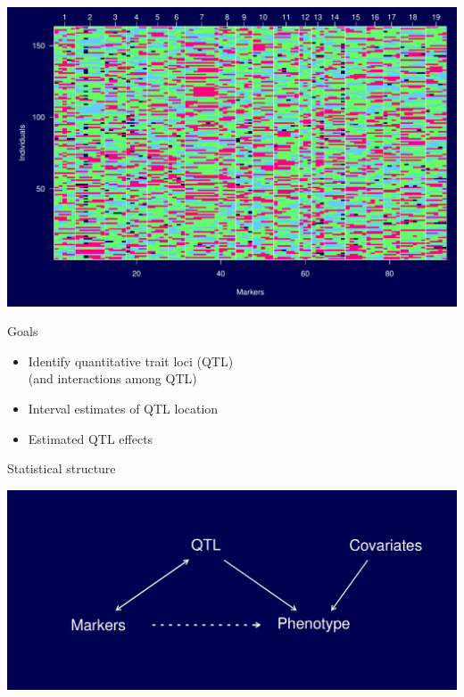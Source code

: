\documentclass[12pt]{article}
\newcommand{\headsize}{\fontsize{35}{35} \selectfont}
\newcommand{\smallsize}{\fontsize{25}{30} \selectfont}
\newcommand{\smallersize}{\fontsize{20}{25} \selectfont}
\begin{document}
\centerline{\includegraphics{FigsA/genodata.pdf}}


\newpage

\headsize \color{myyellow}
\hfill \begin{minipage}{5.75in}
\centering
Goals
\end{minipage}

\vspace{3cm}

\color{mywhite} \smallsize

\hfill \begin{minipage}[t]{9.5in}
\begin{itemize}
\itemsep24pt
\item Identify quantitative trait loci (QTL)\\[6pt]
   {\color{myblue}   (and interactions among QTL)}
\item Interval estimates of QTL location
\item Estimated QTL effects
\end{itemize} \end{minipage}


\newpage

\headsize \color{myyellow}
\hfill \begin{minipage}{5.75in}
\centering
Statistical structure
\end{minipage}

\vspace{2cm} \color{mywhite} \smallersize

\centerline{\includegraphics{FigsA/structure.pdf}}
\end{document}
